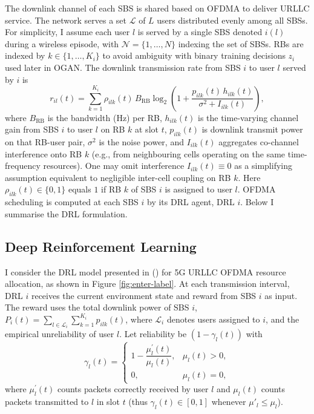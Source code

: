 \documentclass[letterpaper%
, twoside%
, 12pt%
,memoire%
, english%
,creativecommons,hyperref, withAlgo2e %
]{thETS}
\numberwithin{algorithm}{chapter}
\begin{document}
The downlink channel of each SBS is shared based on OFDMA to deliver URLLC service. The network serves a set $\mathcal{L}$ of $L$ users distributed evenly among all SBSs. For simplicity, I assume each user $l$ is served by a single SBS denoted $i(l)$ during a wireless episode, with $\mathcal{N}=\{1,\ldots,N\}$ indexing the set of SBSs. RBs are indexed by $k\in\{1,\ldots,K_i\}$ to avoid ambiguity with binary training decisions $z_i$ used later in OGAN. The downlink transmission rate from SBS $i$ to user $l$ served by $i$ is
\begin{equation}
 r_{il}(t) = \sum_{k=1}^{K_i} \rho_{ilk}(t)\, B_{\mathrm{RB}} \log_{2} \left(1 + \frac{p_{ilk}(t)\, h_{ilk}(t)}{\sigma^2 + I_{ilk}(t)} \right),
\end{equation}
where $B_{\mathrm{RB}}$ is the bandwidth (Hz) per RB, \(h_{ilk}(t)\) is the time-varying channel gain from SBS $i$ to user $l$ on RB $k$ at slot \(t\), \(p_{ilk}(t)\) is downlink transmit power on that RB-user pair, \(\sigma^2\) is the noise power, and \(I_{ilk}(t)\) aggregates co-channel interference onto RB \(k\) (e.g., from neighbouring cells operating on the same time-frequency resources). One may omit interference \(I_{ilk}(t)\equiv 0\) as a simplifying assumption equivalent to negligible inter-cell coupling on RB $k$.
 Here \(\rho_{ilk}(t)\in\{0,1\}\) equals $1$ if RB \(k\) of SBS $i$ is assigned to user $l$. OFDMA scheduling is computed at each SBS $i$ by its DRL agent, DRL $i$. Below I summarise the DRL formulation.


\subsection{Deep Reinforcement Learning}  I consider the DRL model presented in (\cite{kasgari2020experienced}) for 5G URLLC OFDMA resource allocation, as shown in Figure \ref{fig:enter-label}. At each transmission interval, DRL $i$ receives the current environment state and reward from SBS $i$ as input. The reward uses the total downlink power of SBS $i$, \( P_i(t) = \sum_{l \in \mathcal{L}_i} \sum_{k=1}^{K_i} p_{ilk}(t) \), where \(\mathcal{L}_i\) denotes users assigned to $i$, and the empirical unreliability of user $l$. Let reliability be $(1-\gamma_l(t))$ with
\begin{equation}
    \gamma_l(t) =
    \begin{cases}
    1 - \dfrac{\mu^{'}_l(t)}{\mu_l(t)}, & \mu_l(t) > 0,\\
    0, & \mu_l(t) = 0,
    \end{cases}
\end{equation}
where \( \mu^{'}_{l}(t)\) counts packets correctly received by user $l$ and \(\mu_l(t)\) counts packets transmitted to $l$ in slot \(t\) (thus \(\gamma_l(t)\in[0,1]\) whenever \(\mu'_l\le\mu_l\)).
\end{document}
